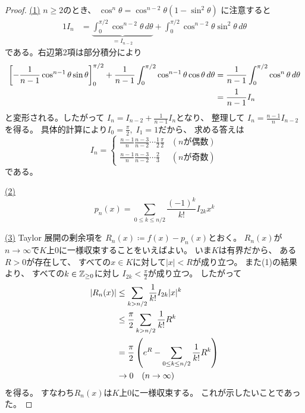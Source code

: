 \documentclass[report]{jlreq}
\begin{document}
\begin{proof}
    \uline{(1)} \quad
    $n \ge 2$のとき、
    $\cos^n \theta = \cos^{n - 2} \theta (1 - \sin^2 \theta)$
    に注意すると
    \begin{alignat}{1}
        I_n
            &= \underbrace{
                \int_0^{\pi / 2} \cos^{n - 2} \theta \, d\theta
            }_{= I_{n - 2}}
                + \int_0^{\pi / 2} \cos^{n - 2} \theta \sin^2 \theta \, d\theta
    \end{alignat}
    である。右辺第2項は部分積分により
    \begin{alignat}{1}
        \left[{
            - \frac{1}{n - 1} \cos^{n - 1} \theta \sin \theta
        }\right]_0^{\pi / 2}
            + \frac{1}{n - 1}
            \int_0^{\pi / 2} \cos^{n - 1} \theta \cos \theta \, d\theta
            &= \frac{1}{n - 1} \int_0^{\pi / 2} \cos^n \theta \, d\theta \\
            &= \frac{1}{n - 1} I_n
    \end{alignat}
    と変形される。したがって
    $I_n = I_{n - 2} + \frac{1}{n - 1} I_n$となり、
    整理して
    $I_n = \frac{n - 1}{n} I_{n - 2}$を得る。
    具体的計算により$I_0 = \frac{\pi}{2}, \; I_1 = 1$だから、
    求める答えは
    \begin{equation}
        I_n = \begin{cases}
            \frac{n - 1}{n} \frac{n - 3}{n - 2} \cdots \frac{1}{2} \frac{\pi}{2}
                & (\text{$n$が偶数}) \\[1ex]
            \frac{n - 1}{n} \frac{n - 3}{n - 2} \cdots \frac{2}{3}
                & (\text{$n$が奇数})
        \end{cases}
    \end{equation}
    である。

    \uline{(2)} \quad
    \begin{equation}
        p_n(x) = \sum_{0 \le k \le n/2}
            \frac{(-1)^k}{k!} I_{2k} x^k
    \end{equation}
    \TODO{}

    \uline{(3)} \quad
    Taylor 展開の剰余項を
    $R_n(x) \coloneqq f(x) - p_n(x)$とおく。
    $R_n(x)$が$n \to \infty$で$K$上$0$に一様収束することをいえばよい。
    いま$K$は有界だから、
    ある$R > 0$が存在して、
    すべての$x \in K$に対して$|x| < R$が成り立つ。
    また(1)の結果より、
    すべての$k \in \mathbb{Z}_{\ge 0}$に対し
    $I_{2k} < \frac{\pi}{2}$が成り立つ。
    したがって
    \begin{alignat}{1}
        |R_n(x)|
            &\le \sum_{k > n/2} \frac{1}{k!} I_{2k} |x|^k \\
            &\le \frac{\pi}{2} \sum_{k > n/2} \frac{1}{k!} R^k \\
            &= \frac{\pi}{2} \left({
                e^R - \sum_{0 \le k \le n/2} \frac{1}{k!} R^k
            }\right) \\
            &\to 0 \quad (\text{$n \to \infty$})
    \end{alignat}
    を得る。
    すなわち$R_n(x)$は$K$上$0$に一様収束する。
    これが示したいことであった。
\end{proof}
\end{document}
